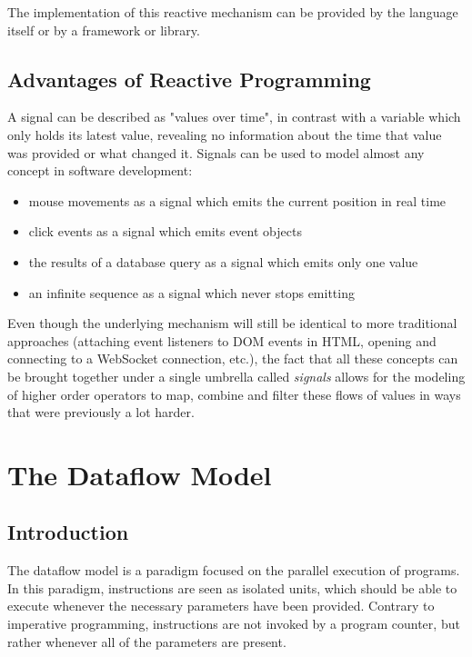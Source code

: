 The implementation of this reactive mechanism can be provided by the language itself or by a framework or library. 

\subsection{Advantages of Reactive Programming}

A signal can be described as "values over time", in contrast with a variable which only holds its latest value, revealing no information about the time that value was provided or what changed it. 
Signals can be used to model almost any concept in software development:
\begin{itemize}
	\item mouse movements as a signal which emits the current position in real time
	\item click events as a signal which emits event objects
	\item the results of a database query as a signal which emits only one value
    \item an infinite sequence as a signal which never stops emitting
\end{itemize}

Even though the underlying mechanism will still be identical to more traditional approaches (attaching event listeners to DOM events in HTML, opening and connecting to a WebSocket connection, etc.), the fact that all these concepts can be brought together under a single umbrella called \textit{signals} allows for the modeling of higher order operators to map, combine and filter these flows of values in ways that were previously a lot harder.

\section{The Dataflow Model}

\subsection{Introduction}

The dataflow model is a paradigm focused on the parallel execution of programs. In this paradigm, instructions are seen as isolated units, which should be able to execute whenever the necessary parameters have been provided. Contrary to imperative programming, instructions are not invoked by a program counter, but rather whenever all of the parameters are present. 

